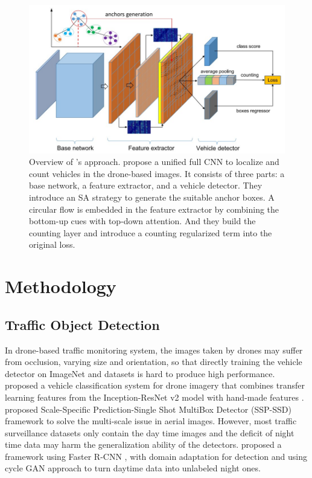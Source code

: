 \documentclass[10pt,twocolumn,letterpaper]{article}  %
\begin{document}
\begin{figure}[!t]
	\centering
	\includegraphics[width=0.95\linewidth]{./figures/li2019simultaneously_framework.jpg} %
	\caption{Overview of \cite{li2019simultaneously}'s approach. propose a unified full CNN to localize and count vehicles in the drone-based images. It consists of three parts: a base network, a feature extractor, and a vehicle detector. They introduce an SA strategy to generate the suitable anchor boxes. A circular flow is embedded in the feature extractor by combining the bottom-up cues with top-down attention. And they build the counting layer and introduce a counting regularized term into the original loss.}
	\label{fig:li2019simultaneously_framework}
\end{figure}

 

\section{Methodology}
\label{section:methodology}
\subsection{Traffic Object Detection}
In drone-based traffic monitoring system, the images taken by drones may suffer from occlusion, varying size and orientation, so that directly training the vehicle detector on ImageNet \cite{russakovsky2015imagenet} and \cite{lin2014microsoft} datasets is hard to produce high performance. \cite{le2018combining} proposed a vehicle classification system for drone imagery that combines transfer learning features from the Inception-ResNet v2 model with hand-made features \cite{szegedy2017inception}. \cite{li2020multi} proposed Scale-Specific Prediction-Single Shot MultiBox Detector (SSP-SSD) framework to solve the multi-scale issue in aerial images. 
However, most traffic surveillance datasets only contain the day time images and the deficit of night time data may harm the generalization ability of the detectors. \cite{li2021domain} proposed a framework using Faster R-CNN \cite{ren2015faster}, with domain adaptation for detection and using cycle GAN approach \cite{zhu2017unpaired} to turn daytime data into unlabeled night ones. 
\end{document}
